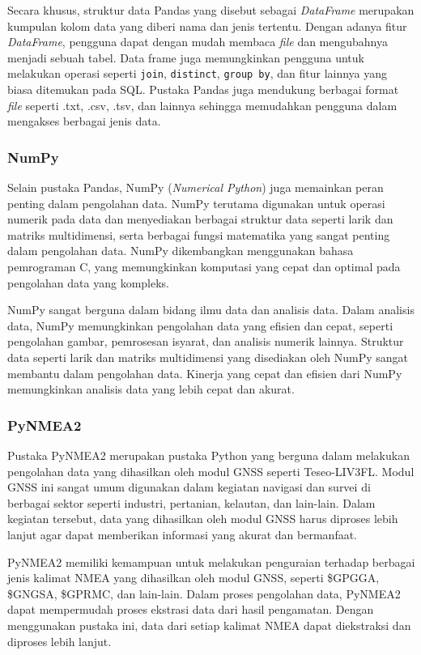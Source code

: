 Secara khusus, struktur data Pandas yang disebut sebagai \textit{DataFrame} merupakan kumpulan kolom data yang diberi nama dan jenis tertentu. Dengan adanya fitur \textit{DataFrame}, pengguna dapat dengan mudah membaca \textit{file} dan mengubahnya menjadi sebuah tabel. Data frame juga memungkinkan pengguna untuk melakukan operasi seperti \texttt{join}, \texttt{distinct}, \texttt{group by}, dan fitur lainnya yang biasa ditemukan pada SQL. Pustaka Pandas juga mendukung berbagai format \textit{file} seperti .txt, .csv, .tsv, dan lainnya sehingga memudahkan pengguna dalam mengakses berbagai jenis data.

\subsubsection{NumPy}
Selain pustaka Pandas, NumPy (\textit{Numerical Python}) juga memainkan peran penting dalam pengolahan data. NumPy terutama digunakan untuk operasi numerik pada data dan menyediakan berbagai struktur data seperti larik dan matriks multidimensi, serta berbagai fungsi matematika yang sangat penting dalam pengolahan data. NumPy dikembangkan menggunakan bahasa pemrograman C, yang memungkinkan komputasi yang cepat dan optimal pada pengolahan data yang kompleks.

NumPy sangat berguna dalam bidang ilmu data dan analisis data. Dalam analisis data, NumPy memungkinkan pengolahan data yang efisien dan cepat, seperti pengolahan gambar, pemrosesan isyarat, dan analisis numerik lainnya. Struktur data seperti larik dan matriks multidimensi yang disediakan oleh NumPy sangat membantu dalam pengolahan data. Kinerja yang cepat dan efisien dari NumPy memungkinkan analisis data yang lebih cepat dan akurat.

\subsubsection{PyNMEA2}
Pustaka PyNMEA2 merupakan pustaka Python yang berguna dalam melakukan pengolahan data yang dihasilkan oleh modul GNSS seperti Teseo\hyp{}LIV3FL. Modul GNSS ini sangat umum digunakan dalam kegiatan navigasi dan survei di berbagai sektor seperti industri, pertanian, kelautan, dan lain-lain. Dalam kegiatan tersebut, data yang dihasilkan oleh modul GNSS harus diproses lebih lanjut agar dapat memberikan informasi yang akurat dan bermanfaat.

PyNMEA2 memiliki kemampuan untuk melakukan penguraian terhadap berbagai jenis kalimat NMEA yang dihasilkan oleh modul GNSS, seperti \$GPGGA, \$GNGSA, \$GPRMC, dan lain-lain. Dalam proses pengolahan data, PyNMEA2 dapat mempermudah proses ekstrasi data dari hasil pengamatan. Dengan menggunakan pustaka ini, data dari setiap kalimat NMEA dapat diekstraksi dan diproses lebih lanjut.


